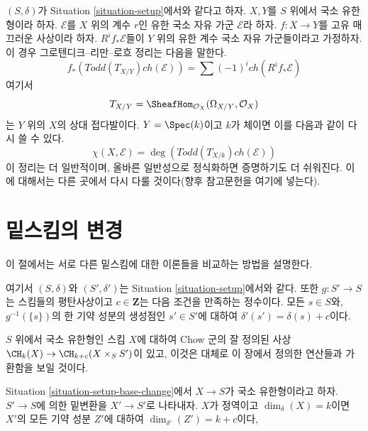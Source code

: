 \noindent
$(S, \delta)$가 Situation \ref{situation-setup}에서와 같다고 하자.
$X, Y$를 $S$ 위에서 국소 유한형이라 하자. $\mathcal{E}$를 $X$ 위의
계수 $r$인 유한 국소 자유 가군 ${\mathcal E}$라 하자.
$f : X \to Y$를 고유 매끄러운 사상이라 하자.
$R^if_*\mathcal{E}$들이 $Y$ 위의 유한 계수 국소 자유 가군들이라고
가정하자. 이 경우 그로텐디크--리만--로흐 정리는 다음을 말한다.
$$
f_*(Todd(T_{X/Y}) ch(\mathcal{E}))
=
\sum (-1)^i ch(R^if_*\mathcal{E})
$$
여기서
$$
T_{X/Y} = \SheafHom_{\mathcal{O}_X}(\Omega_{X/Y}, \mathcal{O}_X)
$$
는 $Y$ 위의 $X$의 상대 접다발이다. $Y = \Spec(k)$이고 $k$가
체이면 이를 다음과 같이 다시 쓸 수 있다.
$$
\chi(X, \mathcal{E}) = \deg(Todd(T_{X/k}) ch(\mathcal{E}))
$$
이 정리는 더 일반적이며, 올바른 일반성으로 정식화하면 증명하기도 더
쉬워진다. 이에 대해서는 다른 곳에서 다시 다룰 것이다(향후 참고문헌을
여기에 넣는다).







\section{밑스킴의 변경}
\label{section-change-base}

\noindent
이 절에서는 서로 다른 밑스킴에 대한 이론들을 비교하는 방법을
설명한다.

\begin{situation}
\label{situation-setup-base-change}
여기서 $(S, \delta)$와 $(S', \delta')$는 Situation
\ref{situation-setup}에서와 같다. 또한 $g : S' \to S$는 스킴들의
평탄사상이고 $c \in \mathbf{Z}$는 다음 조건을 만족하는 정수이다.
모든 $s \in S$와, $g^{-1}(\{s\})$의 한 기약 성분의 생성점인
$s' \in S'$에 대하여 $\delta'(s') = \delta(s) + c$이다.
\end{situation}

\noindent
$S$ 위에서 국소 유한형인 스킴 $X$에 대하여 Chow 군의 잘 정의된 사상
$\CH_k(X) \to \CH_{k + c}(X \times_S S')$이 있고, 이것은 대체로
이 장에서 정의한 연산들과 가환함을 보일 것이다.

\begin{lemma}
\label{lemma-dimension-base-change}
Situation \ref{situation-setup-base-change}에서 $X \to S$가 국소
유한형이라고 하자. $S' \to S$에 의한 밑변환을 $X' \to S'$로
나타내자. $X$가 정역이고 $\dim_\delta(X) = k$이면 $X'$의 모든
기약 성분 $Z'$에 대하여 $\dim_{\delta'}(Z') = k + c$이다,
\end{lemma}

